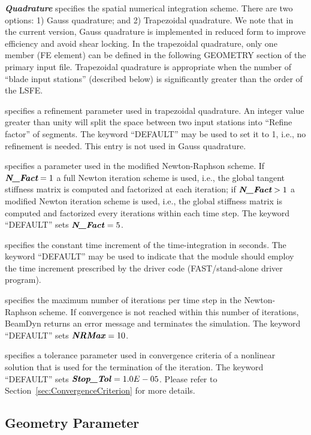 \textbf{\textit{Quadrature}} specifies the spatial numerical integration scheme. 
There are two options: 1) Gauss quadrature; and 2) Trapezoidal quadrature. 
We note that in the current version, Gauss quadrature is implemented in reduced form to improve efficiency and avoid shear locking. 
In the trapezoidal quadrature, only one member (FE element) can be defined in the following GEOMETRY section of the primary input file.  
Trapezoidal quadrature is appropriate when the number of ``blade input stations'' (described below) is significantly greater than the order of the LSFE.

 specifies a refinement parameter used in trapezoidal quadrature. 
An integer value greater than unity will split the space between two input stations into ``Refine factor'' of segments.
The keyword ``DEFAULT'' may be used to set it to 1, i.e., no refinement is needed. 
This entry is not used in Gauss quadrature.   

 specifies a parameter used in the modified Newton-Raphson scheme. 
If $\textit{\textbf{N\_Fact}} = 1$ a full Newton iteration scheme is used, i.e., the global tangent stiffness matrix is computed and factorized at each iteration; if $\textit{\textbf{N\_Fact}} >  1$ a modified Newton iteration scheme is used, i.e., 
the global stiffness matrix is computed and factorized every  iterations within each time step. 
The keyword ``DEFAULT'' sets $\textbf{\textit{N\_Fact}} = 5$.

 specifies the constant time increment of the time-integration in seconds. 
The keyword ``DEFAULT'' may be used to indicate that the module should employ the time increment prescribed by the driver code (FAST/stand-alone driver program).

 specifies the maximum number of iterations per time step in the Newton-Raphson scheme. 
If convergence is not reached within this number of iterations, BeamDyn returns an error message and terminates the simulation. 
The keyword ``DEFAULT'' sets $\textbf{\textit{NRMax}} = 10$.

 specifies a tolerance parameter used in convergence criteria of a nonlinear solution that is used for the termination of the iteration. 
The keyword ``DEFAULT'' sets $\textbf{\textit{Stop\_Tol}} = 1.0E-05$. Please refer to Section~\ref{sec:ConvergenceCriterion} for more details.


\subsection{Geometry Parameter}

